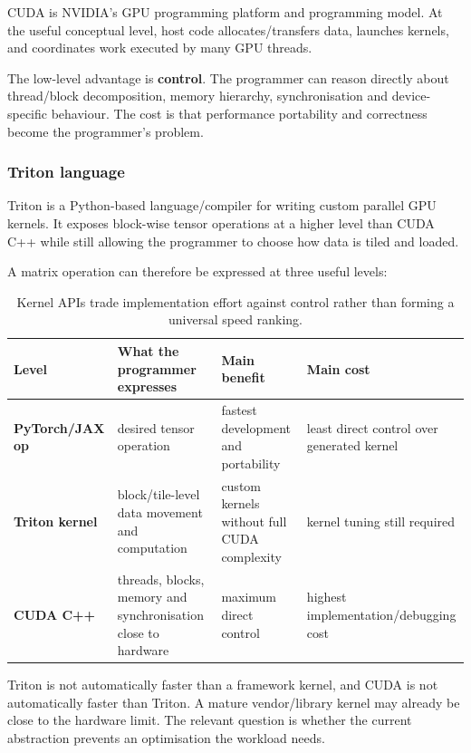 CUDA is NVIDIA's GPU programming platform and programming model.
At the useful conceptual level, host code allocates/transfers data, launches kernels, and coordinates work executed by many GPU threads.

The low-level advantage is \textbf{control}.
The programmer can reason directly about thread/block decomposition, memory hierarchy, synchronisation and device-specific behaviour.
The cost is that performance portability and correctness become the programmer's problem.

\subsubsection*{Triton language}

Triton is a Python-based language/compiler for writing custom parallel GPU kernels.
It exposes block-wise tensor operations at a higher level than CUDA C++ while still allowing the programmer to choose how data is tiled and loaded.

A matrix operation can therefore be expressed at three useful levels:

\begin{table}[ht]
\centering
\small
\begin{tabularx}{\textwidth}{>{\bfseries}p{2.4cm} X X X}
\toprule
Level & What the programmer expresses & Main benefit & Main cost \\
\midrule
PyTorch/JAX op & desired tensor operation & fastest development and portability & least direct control over generated kernel \\
Triton kernel & block/tile-level data movement and computation & custom kernels without full CUDA complexity & kernel tuning still required \\
CUDA C++ & threads, blocks, memory and synchronisation close to hardware & maximum direct control & highest implementation/debugging cost \\
\bottomrule
\end{tabularx}
\caption{Kernel APIs trade implementation effort against control rather than forming a universal speed ranking.}
\label{tab:kernel-layers}
\end{table}

Triton is not automatically faster than a framework kernel, and CUDA is not automatically faster than Triton.
A mature vendor/library kernel may already be close to the hardware limit.
The relevant question is whether the current abstraction prevents an optimisation the workload needs.

